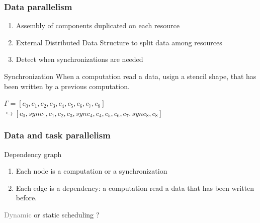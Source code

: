 \documentclass{beamer}
\begin{document}
\begin{frame}
\frametitle{Data parallelism}
\begin{enumerate}
\item Assembly of components duplicated on each resource
\item External Distributed Data Structure to split data among resources
\item Detect when synchronizations are needed
\end{enumerate}

\medskip
\begin{block}{Synchronization}
When a computation read a data, usign a stencil shape, that has been written by a previous computation.
\end{block}

$\Gamma = [c_0,c_1,c_2,c_3,c_4,c_5,c_6,c_7,c_8]$\\
$\hookrightarrow [c_0,sync_1,c_1,c_2,c_3,sync_4,c_4,c_5,c_6,c_7,sync_8,c_8]$
\end{frame}

\begin{frame}
\frametitle{Data and task parallelism}

\begin{block}{Dependency graph}
\begin{enumerate}
\item Each node is a computation or a synchronization
\item Each edge is a dependency: a computation read a data that has been written before.
\end{enumerate}
\end{block}

\begin{center}
\end{center}

\begin{center}
\textcolor{gray}{Dynamic} or static scheduling ?
\end{center}
\end{frame}
\end{document}
